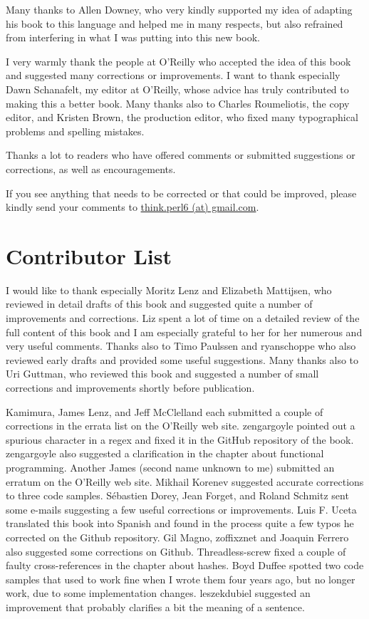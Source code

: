 Many thanks to Allen Downey, who very kindly supported my idea of 
adapting his book to this language and helped me in many respects, but 
also refrained from interfering in what I was putting into 
this new book.

I very warmly thank the people at O'Reilly who accepted the 
idea of this book and suggested many corrections or 
improvements. I want to thank especially 
Dawn Schanafelt, my editor at O'Reilly, whose advice 
has truly contributed to making this a better book. Many 
thanks also to Charles Roumeliotis, the copy editor, and 
Kristen Brown, the production editor, who fixed many 
typographical problems and spelling mistakes.

Thanks a lot to readers who have offered comments 
or submitted suggestions or corrections, as well as encouragements.

If you see anything that needs to be corrected or that 
could be improved, please kindly send your comments to 
\url{think.perl6 (at) gmail.com}.


\section*{Contributor List}

I would like to thank especially Moritz Lenz and Elizabeth 
Mattijsen, who reviewed in detail drafts of this book 
and suggested quite a number of improvements and corrections. Liz 
spent a lot of time on a detailed review of the full 
content of this book and I am especially grateful to her for 
her numerous and very useful comments. Thanks also to Timo Paulssen and 
ryanschoppe who also reviewed early drafts and provided some  
useful suggestions. Many thanks also to Uri Guttman, who reviewed 
this book and suggested a number of small corrections and improvements 
shortly before publication. 

Kamimura, James Lenz, and Jeff McClelland each submitted a couple 
of corrections in the errata list on the O'Reilly web site.
zengargoyle pointed out a spurious character in a regex 
and fixed it in the GitHub repository of the book. zengargoyle
also suggested a clarification in the chapter about functional 
programming. Another James (second name unknown to me) 
submitted an erratum on the O'Reilly web site. Mikhail Korenev 
suggested accurate corrections to three code samples.  
Sébastien Dorey, Jean Forget, and Roland Schmitz sent some e-mails 
suggesting a few useful corrections or improvements.
Luis F. Uceta translated this book into Spanish and found in the 
process quite a few typos he corrected on the Github repository. 
Gil Magno, zoffixznet and Joaquin Ferrero also suggested some 
corrections on Github. Threadless-screw fixed a couple of 
faulty cross-references in the chapter about hashes. 
Boyd Duffee spotted two code samples that used to work fine when 
I wrote them four years ago, but no longer work, due to some 
implementation changes. leszekdubiel suggested an improvement 
that probably clarifies a bit the meaning of a sentence.


\clearemptydoublepage

\begin{latexonly}

\tableofcontents

\clearemptydoublepage

\end{latexonly}


